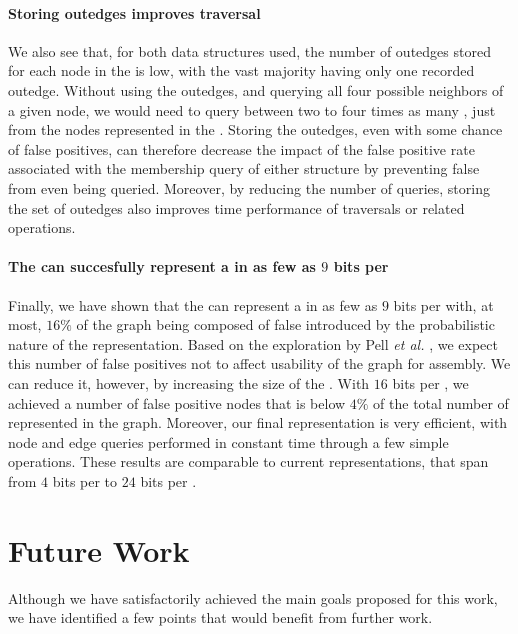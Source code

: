 \paragraph*{Storing outedges improves traversal}

We also see that, for both data structures used, the number of outedges stored for each node in the \dBG is low, with the vast majority having only one recorded outedge. Without using the outedges, and querying all four possible neighbors of a given node, we would need to query between two to four times as many , just from the nodes represented in the \dBG. Storing the outedges, even with some chance of false positives, can therefore decrease the impact of the false positive rate associated with the membership query of either structure by preventing false  from even being queried. Moreover, by reducing the number of queries, storing the set of outedges also improves time performance of traversals or related operations.

\paragraph*{The \dBHT can succesfully represent a \dBG in as few as $9$ bits per \kmer}

Finally, we have shown that the \dBHT can represent a \dBG in as few as $9$ bits per \kmer with, at most, $16\%$ of the graph being composed of false  introduced by the probabilistic nature of the representation. Based on the exploration by Pell \emph{et al.} \cite{Pell2012}, we expect this number of false positives not to affect usability of the graph for assembly. We can reduce it, however, by increasing the size of the \dBHT. With $16$ bits per \kmer, we achieved a number of false positive nodes that is below $4\%$ of the total number of  represented in the graph. Moreover, our final \dBHT representation is very efficient, with node and edge queries performed in constant time through a few simple operations.
These results are comparable to current \dBG representations, that span from $4$ bits per \kmer to $24$ bits per \kmer \cite{Chikhi2013, Giani2020}.

\section{Future Work}

Although we have satisfactorily achieved the main goals proposed for this work, we have identified a few points that would benefit from further work. 

